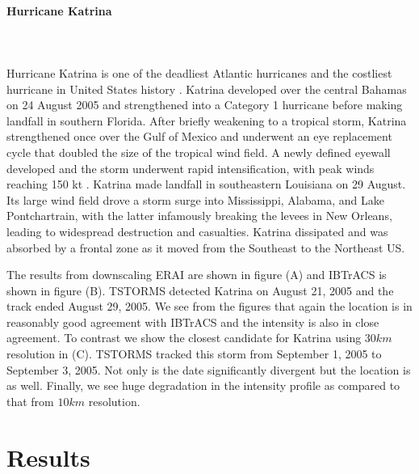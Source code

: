 \documentclass[phd,tocprelim]{cornell}
\newcommand{\myparagraph}[1]{\paragraph{#1}\mbox{}\\\mbox{}\\}
\begin{document}
\myparagraph{Hurricane Katrina}
Hurricane Katrina is one of the deadliest Atlantic hurricanes and 
the costliest hurricane in United States history \cite{beven}.  
Katrina developed over the central Bahamas on 24 August 2005 and 
strengthened into a Category 1 hurricane before making landfall 
in southern Florida.  After briefly weakening to a tropical storm, 
Katrina strengthened once over the Gulf of Mexico and underwent 
an eye replacement cycle that doubled the size of the tropical 
wind field. A newly defined eyewall developed and the storm 
underwent rapid intensification, with peak winds reaching 150 
kt \cite{beven}.  Katrina made landfall in southeastern Louisiana 
on 29 August.  Its large wind field drove a storm surge into 
Mississippi, Alabama, and Lake Pontchartrain, with the latter 
infamously breaking the levees in New Orleans, leading to widespread 
destruction and casualties.  Katrina dissipated and was absorbed 
by a frontal zone as it moved from the Southeast to the Northeast US.
\par
The results from downscaling ERAI are shown in figure 
 (A) and IBTrACS is shown in figure 
 (B). TSTORMS detected Katrina on August 
21, 2005 and the track ended August 29, 2005. We see from the 
figures that again the location is in reasonably good agreement 
with IBTrACS and the intensity is also in close agreement. To 
contrast we show the closest candidate for Katrina using $30km$ 
resolution in  (C). TSTORMS tracked 
this storm from September 1, 2005 to September 3, 2005. Not only 
is the date significantly divergent but the location is as well. 
Finally, we see huge degradation in the intensity profile as 
compared to that from $10km$ resolution.    

\section{Results}\label{results}
\end{document}
